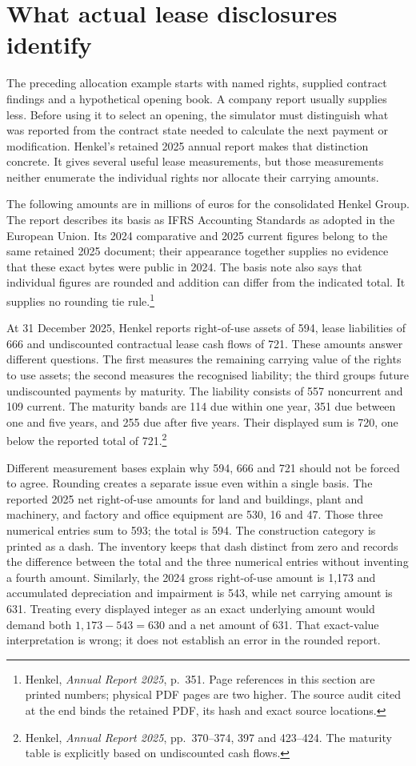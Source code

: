 \section{What actual lease disclosures identify}
\label{sec:henkel-lease-measurements}

The preceding allocation example starts with named rights, supplied contract
findings and a hypothetical opening book. A company report usually supplies
less. Before using it to select an opening, the simulator must distinguish what
was reported from the contract state needed to calculate the next payment or
modification. Henkel's retained 2025 annual report makes that distinction
concrete. It gives several useful lease measurements, but those measurements
neither enumerate the individual rights nor allocate their carrying amounts.

The following amounts are in millions of euros for the consolidated Henkel
Group. The report describes its basis as IFRS Accounting Standards as adopted
in the European Union. Its 2024 comparative and 2025 current figures belong to
the same retained 2025 document; their appearance together supplies no evidence
that these exact bytes were public in 2024. The basis note also says that
individual figures are rounded and addition can differ from the indicated
total. It supplies no rounding tie rule.\footnote{Henkel, \emph{Annual Report
2025}, p.~351. Page references in this section are printed numbers; physical
PDF pages are two higher. The source audit cited at the end binds the retained
PDF, its hash and exact source locations.}

At 31 December 2025, Henkel reports right-of-use assets of 594, lease
liabilities of 666 and undiscounted contractual lease cash flows of 721.
These amounts answer different questions. The first measures the remaining
carrying value of the rights to use assets; the second measures the recognised
liability; the third groups future undiscounted payments by maturity. The
liability consists of 557 noncurrent and 109 current. The maturity bands are
114 due within one year, 351 due between one and five years, and 255 due after
five years. Their displayed sum is 720, one below the reported total of
721.\footnote{Henkel, \emph{Annual Report 2025}, pp.~370--374, 397 and 423--424.
The maturity table is explicitly based on undiscounted cash flows.}

Different measurement bases explain why 594, 666 and 721 should not be forced
to agree. Rounding creates a separate issue even within a single basis.
The reported 2025 net right-of-use amounts for land and buildings, plant and
machinery, and factory and office equipment are 530, 16 and 47. Those three
numerical entries sum to 593; the total is 594. The construction category is
printed as a dash. The inventory keeps that dash distinct from zero and records
the difference between the total and the three numerical entries without
inventing a fourth amount. Similarly, the 2024 gross right-of-use amount is
1,173 and accumulated depreciation and impairment is 543, while net carrying
amount is 631. Treating every displayed integer as an exact underlying amount
would demand both $1{,}173-543=630$ and a net amount of 631. That exact-value
interpretation is wrong; it does not establish an error in the rounded report.

